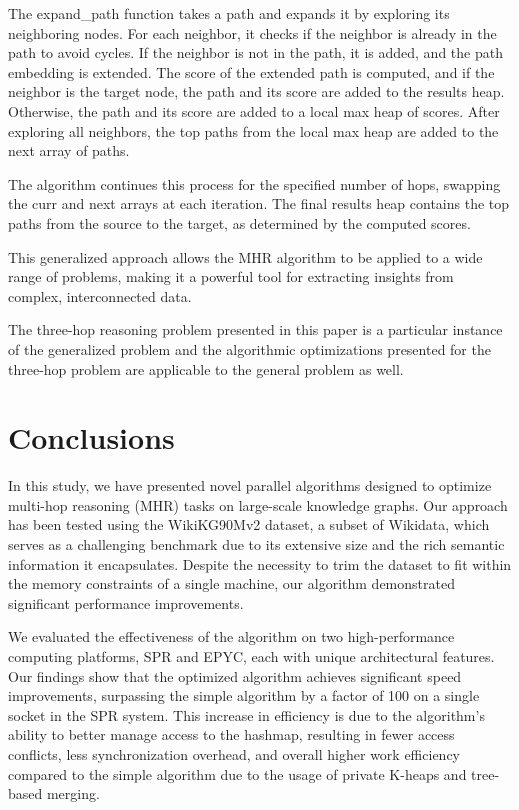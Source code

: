 \documentclass[sigconf]{acmart}
\begin{document}
The expand\_path function takes a path and expands it by exploring its neighboring nodes. For each neighbor, it checks if the neighbor is already in the path to avoid cycles. If the neighbor is not in the path, it is added, and the path embedding is extended. The score of the extended path is computed, and if the neighbor is the target node, the path and its score are added to the results heap. Otherwise, the path and its score are added to a local max heap of scores. After exploring all neighbors, the top paths from the local max heap are added to the next array of paths.

The algorithm continues this process for the specified number of hops, swapping the curr and next arrays at each iteration. The final results heap contains the top paths from the source to the target, as determined by the computed scores.

This generalized approach allows the MHR algorithm to be applied to a wide range of problems, making it a powerful tool for extracting insights from complex, interconnected data.

The three-hop reasoning problem presented in this paper is a particular instance of the generalized problem and the algorithmic optimizations presented for the three-hop problem are applicable to the general problem as well.
\section{Conclusions}
In this study, we have presented novel parallel algorithms designed to optimize multi-hop reasoning (MHR) tasks on large-scale knowledge graphs. Our approach has been tested using the WikiKG90Mv2 dataset, a subset of Wikidata, which serves as a challenging benchmark due to its extensive size and the rich semantic information it encapsulates. Despite the necessity to trim the dataset to fit within the memory constraints of a single machine, our algorithm demonstrated significant performance improvements.

We evaluated the effectiveness of the algorithm on two high-performance computing platforms, SPR and EPYC, each with unique architectural features. Our findings show that the optimized algorithm achieves significant speed improvements, surpassing the simple algorithm by a factor of 100 on a single socket in the SPR system. This increase in efficiency is due to the algorithm's ability to better manage access to the hashmap, resulting in fewer access conflicts, less synchronization overhead, and overall higher work efficiency compared to the simple algorithm due to the usage of private K-heaps and tree-based merging. 
\end{document}
